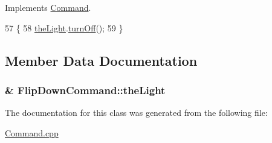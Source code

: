 Implements \hyperlink{classCommand_a6fd7d9bd8df8bfc881e4d6c7cd1878b7}{Command}.


\begin{DoxyCode}
57     \{
58         \hyperlink{classFlipDownCommand_a74f7f12538ecf5b5921e289a4c1129a5}{theLight}.\hyperlink{classLight_aee2ab836d8c984756e10e8e301130aa4}{turnOff}();
59     \}
\end{DoxyCode}


\subsection{Member Data Documentation}
\subsubsection[{\texorpdfstring{the\+Light}{theLight}}]{\& Flip\+Down\+Command\+::the\+Light\hspace{0.3cm}{\ttfamily [private]}}\hypertarget{classFlipDownCommand_a74f7f12538ecf5b5921e289a4c1129a5}{}\label{classFlipDownCommand_a74f7f12538ecf5b5921e289a4c1129a5}


The documentation for this class was generated from the following file\+:\begin{DoxyCompactItemize}
\item 
\hyperlink{Command_8cpp}{Command.\+cpp}\end{DoxyCompactItemize}

